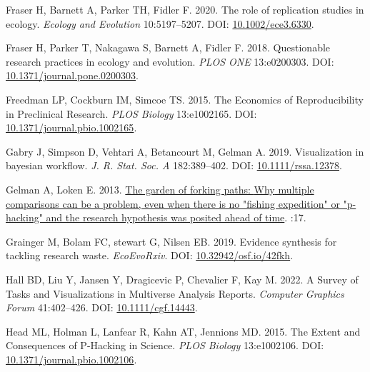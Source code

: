 \documentclass[10pt,a4paper]{article}
\newlength{\cslhangindent}
\newlength{\cslentryspacingunit} %
\newenvironment{CSLReferences}[2] %
 {%
  \setlength{\parindent}{0pt}
  \ifodd #1
  \let\oldpar\par
  \def\par{\hangindent=\cslhangindent\oldpar}
  \fi
  \setlength{\parskip}{#2\cslentryspacingunit}
 }%
 {}
\begin{document}
\begin{CSLReferences}{1}{0}
\leavevmode{}%
Fraser H, Barnett A, Parker TH, Fidler F. 2020. The role of replication studies in ecology. \emph{Ecology and Evolution} 10:5197--5207. DOI: \href{https://doi.org/10.1002/ece3.6330}{10.1002/ece3.6330}.

\leavevmode{}%
Fraser H, Parker T, Nakagawa S, Barnett A, Fidler F. 2018. Questionable research practices in ecology and evolution. \emph{PLOS ONE} 13:e0200303. DOI: \href{https://doi.org/10.1371/journal.pone.0200303}{10.1371/journal.pone.0200303}.

\leavevmode{}%
Freedman LP, Cockburn IM, Simcoe TS. 2015. The {Economics} of {Reproducibility} in {Preclinical} {Research}. \emph{PLOS Biology} 13:e1002165. DOI: \href{https://doi.org/10.1371/journal.pbio.1002165}{10.1371/journal.pbio.1002165}.

\leavevmode{}%
Gabry J, Simpson D, Vehtari A, Betancourt M, Gelman A. 2019. Visualization in bayesian workflow. \emph{J. R. Stat. Soc. A} 182:389--402. DOI: \href{https://doi.org/10.1111/rssa.12378}{10.1111/rssa.12378}.

\leavevmode{}%
Gelman A, Loken E. 2013. \href{http://www.stat.columbia.edu/~gelman/research/unpublished/p_hacking.pdf}{The garden of forking paths: {Why} multiple comparisons can be a problem, even when there is no "fishing expedition" or "p-hacking" and the research hypothesis was posited ahead of time}. :17.

\leavevmode{}%
Grainger M, Bolam FC, stewart G, Nilsen EB. 2019. Evidence synthesis for tackling research waste. \emph{EcoEvoRxiv}. DOI: \href{https://doi.org/10.32942/osf.io/42fkh}{10.32942/osf.io/42fkh}.

\leavevmode{}%
Hall BD, Liu Y, Jansen Y, Dragicevic P, Chevalier F, Kay M. 2022. A {Survey} of {Tasks} and {Visualizations} in {Multiverse} {Analysis} {Reports}. \emph{Computer Graphics Forum} 41:402--426. DOI: \href{https://doi.org/10.1111/cgf.14443}{10.1111/cgf.14443}.

\leavevmode{}%
Head ML, Holman L, Lanfear R, Kahn AT, Jennions MD. 2015. The {Extent} and {Consequences} of {P}-{Hacking} in {Science}. \emph{PLOS Biology} 13:e1002106. DOI: \href{https://doi.org/10.1371/journal.pbio.1002106}{10.1371/journal.pbio.1002106}.


\end{CSLReferences}
\end{document}
